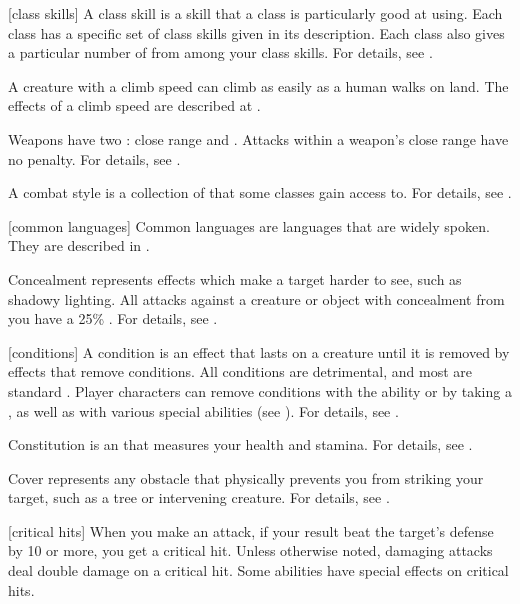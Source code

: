 [class skills] A class skill is a skill that a class is particularly good at using.
Each class has a specific set of class skills given in its description.
Each class also gives a particular number of  from among your class skills.
For details, see .

 A creature with a climb speed can climb as easily as a human walks on land.
The effects of a climb speed are described at .

 Weapons have two : close range and .
Attacks within a weapon's close range have no penalty.
For details, see .

 A combat style is a collection of  that some classes gain access to.
For details, see .

[common languages] Common languages are languages that are widely spoken.
They are described in .

 Concealment represents effects which make a target harder to see, such as shadowy lighting.
All  attacks against a creature or object with concealment from you have a 25\% .
For details, see .

[conditions] A condition is an effect that lasts on a creature until it is removed by effects that remove conditions.
All conditions are detrimental, and most are standard .
Player characters can remove conditions with the  ability or by taking a , as well as with various special abilities (see ).
For details, see .

 Constitution is an  that measures your health and stamina.
For details, see .

 Cover represents any obstacle that physically prevents you from striking your target, such as a tree or intervening creature.
For details, see .

[critical hits] When you make an attack, if your result beat the target's defense by 10 or more, you get a critical hit.
Unless otherwise noted, damaging attacks deal double damage on a critical hit.
Some abilities have special effects on critical hits.

